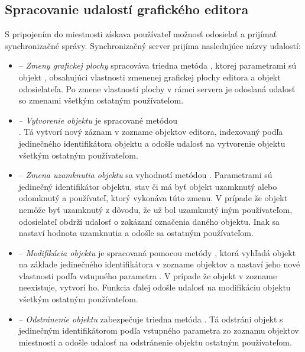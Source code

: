 \subsection{Spracovanie udalostí grafického editora}
S pripojením do miestnosti získava používateľ možnosť odosielať a prijímať synchronizačné správy. Synchronizačný server prijíma nasledujúce názvy udalostí:
\begin{itemize}
	
	\item {} -- \textit{Zmeny grafickej plochy} spracováva triedna metóda , ktorej parametrami sú objekt , obsahujúci vlastnosti zmenenej grafickej plochy editora a  objekt odosielateľa. Po zmene vlastností plochy v rámci servera je odoslaná udalosť so zmenami všetkým ostatným používateľom.
	
	\item {} -- \textit{Vytvorenie objektu} je spracované metódou \\. Tá vytvorí nový záznam v zozname objektov editora, indexovaný podľa jedinečného identifikátora objektu a odošle udalosť na vytvorenie objektu všetkým ostatným používateľom.
	
	\item {} -- \textit{Zmena uzamknutia objektu} sa vyhodnotí metódou . Parametrami sú jedinečný identifikátor objektu, stav či má byť objekt uzamknutý alebo odomknutý a používateľ, ktorý vykonáva túto zmenu. V prípade že objekt nemôže byť uzamknutý z dôvodu, že už bol uzamknutý iným používateľom, odosielateľ obdrží udalosť o zakázaní označenia daného objektu. Inak sa nastaví hodnota uzamknutia a odošle sa ostatným používateľom.
	
	\item {} -- \textit{Modifikácia objektu} je spracovaná pomocou metódy , ktorá vyhľadá objekt na základe jedinečného identifikátora v zozname objektov a nastaví jeho nové vlastnosti podľa vstupného parametra . V prípade že objekt v zozname neexistuje, vytvorí ho. Funkcia ďalej odošle udalosť na modifikáciu objektu všetkým ostatným používateľom.
	
	\item {} -- \textit{Odstránenie objektu} zabezpečuje triedna metóda . Tá odstráni objekt s jedinečným identifikátorom podľa vstupného parametra zo zoznamu objektov miestnosti a odošle udalosť na odstránenie objektu ostatným používateľom.
	

\end{itemize}
